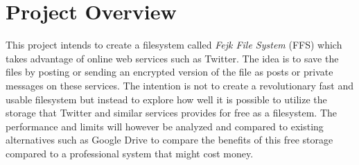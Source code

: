 \section{Project Overview}

This project intends to create a filesystem called \textit{Fejk File System} (FFS) which takes advantage of online web services such as Twitter. The idea is to save the files by posting or sending an encrypted version of the file as posts or private messages on these services. The intention is not to create a revolutionary fast and usable filesystem but instead to explore how well it is possible to utilize the storage that Twitter and similar services provides for free as a filesystem. The performance and limits will however be analyzed and compared to existing alternatives such as Google Drive to compare the benefits of this free storage compared to a professional system that might cost money.